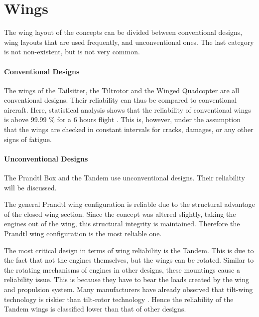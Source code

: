 \section{Wings}
The wing layout of the concepts can be divided between conventional designs, wing layouts that are used frequently, and unconventional ones. The last category is not non-existent, but is not very common.


\paragraph{Conventional Designs}
The wings of the Tailsitter, the Tiltrotor and the Winged Quadcopter are all conventional designs. Their reliability can thus be compared to conventional aircraft. Here, statistical analysis shows that the reliability of conventional wings is above 99.99 \% for a 6 hours flight \cite{reliability}. This is, however, under the assumption that the wings are checked in constant intervals for cracks, damages, or any other signs of fatigue.

\paragraph{Unconventional Designs}
The Prandtl Box and the Tandem use unconventional designs. Their reliability will be discussed.


The general Prandtl wing configuration is reliable due to the structural advantage of the closed wing section. Since the concept was altered slightly, taking the engines out of the wing, this structural integrity is maintained. Therefore the Prandtl wing configuration is the most reliable one.

The most critical design in terms of wing reliability is the Tandem. This is due to the fact that not the engines themselves, but the wings can be rotated. Similar to the rotating mechanisms of engines in other designs, these mountings cause a reliability issue. This is because they have to bear the loads created by the wing and propulsion system. Many manufacturers have already observed that tilt-wing technology is riskier than tilt-rotor technology \cite{princeton}. Hence the reliability of the Tandem wings is classified lower than that of other designs. 



































